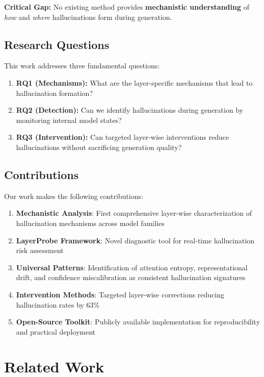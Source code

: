 \documentclass[11pt]{article}
\begin{document}
\textbf{Critical Gap:} No existing method provides \textbf{mechanistic understanding} of \textit{how} and \textit{where} hallucinations form during generation.

\subsection{Research Questions}

This work addresses three fundamental questions:

\begin{enumerate}
    \item \textbf{RQ1 (Mechanisms):} What are the layer-specific mechanisms that lead to hallucination formation?
    \item \textbf{RQ2 (Detection):} Can we identify hallucinations during generation by monitoring internal model states?
    \item \textbf{RQ3 (Intervention):} Can targeted layer-wise interventions reduce hallucinations without sacrificing generation quality?
\end{enumerate}

\subsection{Contributions}

Our work makes the following contributions:

\begin{enumerate}
    \item \textbf{Mechanistic Analysis}: First comprehensive layer-wise characterization of hallucination mechanisms across model families
    \item \textbf{LayerProbe Framework}: Novel diagnostic tool for real-time hallucination risk assessment
    \item \textbf{Universal Patterns}: Identification of attention entropy, representational drift, and confidence miscalibration as consistent hallucination signatures
    \item \textbf{Intervention Methods}: Targeted layer-wise corrections reducing hallucination rates by 63\%
    \item \textbf{Open-Source Toolkit}: Publicly available implementation for reproducibility and practical deployment
\end{enumerate}

\section{Related Work}
\end{document}
